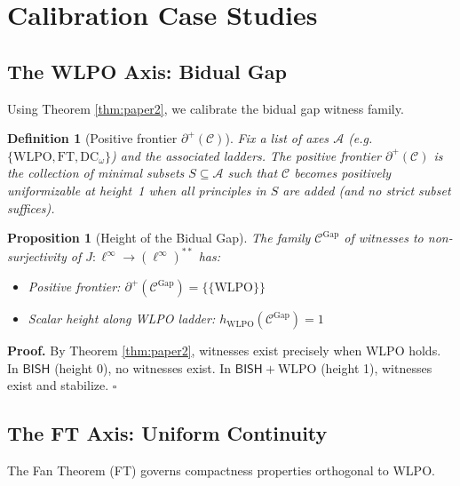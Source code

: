 \documentclass[11pt]{article}
\newtheorem{definition}[theorem]{Definition}
\newtheorem{proposition}[theorem]{Proposition}
\newenvironment{proof}[1][Proof]{\noindent\textbf{#1.}\hspace{0.5em}}{\hfill$\square$\par}
\newcommand{\WLPO}{\mathrm{WLPO}}
\newcommand{\FT}{\mathrm{FT}}
\newcommand{\DCw}{\mathrm{DC}_\omega}
\newcommand{\BISH}{\mathsf{BISH}}
\newcommand{\linf}{\ell^\infty}
\newcommand{\Frontierpos}{\partial^{+}}
\begin{document}
\section{Calibration Case Studies}

\subsection{The WLPO Axis: Bidual Gap}

Using Theorem \ref{thm:paper2}, we calibrate the bidual gap witness family.

\begin{definition}[Positive frontier $\Frontierpos(\mathcal{C})$]
Fix a list of axes $\mathcal{A}$ (e.g. $\{\WLPO,\FT,\DCw\}$) and the associated ladders.
The \emph{positive frontier} $\Frontierpos(\mathcal{C})$ is the collection of \emph{minimal}
subsets $S\subseteq\mathcal{A}$ such that $\mathcal{C}$ becomes positively uniformizable
at height~1 when all principles in $S$ are added (and no strict subset suffices).
\end{definition}

\begin{proposition}[Height of the Bidual Gap]
The family $\mathcal{C}^{\text{Gap}}$ of witnesses to non-surjectivity of $J: \linf \to (\linf)^{**}$ has:
\begin{itemize}
\item Positive frontier: $\Frontierpos(\mathcal{C}^{\text{Gap}}) = \{\{\WLPO\}\}$
\item Scalar height along WLPO ladder: $h_{\WLPO}(\mathcal{C}^{\text{Gap}}) = 1$
\end{itemize}
\end{proposition}

\begin{proof}
By Theorem \ref{thm:paper2}, witnesses exist precisely when WLPO holds. In $\BISH$ (height 0), no witnesses exist. In $\BISH + \WLPO$ (height 1), witnesses exist and stabilize.
\end{proof}

\subsection{The FT Axis: Uniform Continuity}

The Fan Theorem (FT) governs compactness properties orthogonal to WLPO.
\end{document}
